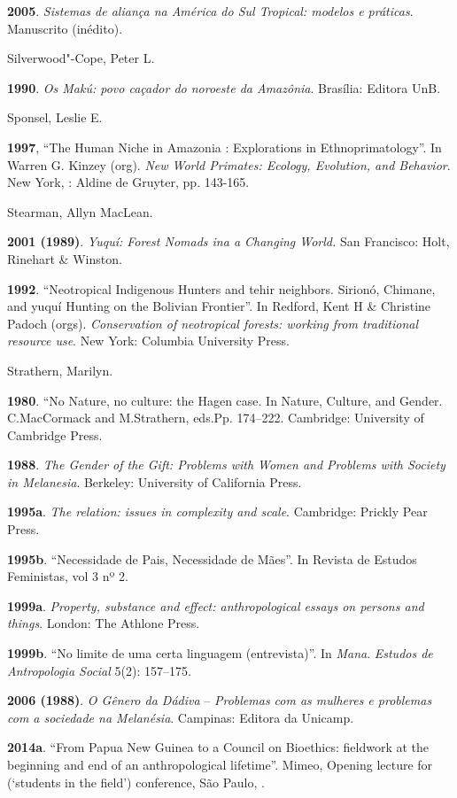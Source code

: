 \textbf{2005}. \emph{Sistemas de aliança na América do Sul Tropical:
modelos e práticas}. Manuscrito (inédito).

Silverwood"-Cope, Peter L.

\textbf{1990}. \emph{Os Makú: povo caçador do noroeste da Amazônia}.
Brasília: Editora UnB.

Sponsel, Leslie E.

\textbf{1997}, ``The Human Niche in Amazonia : Explorations in
Ethnoprimatology''. In Warren G. Kinzey (org). \emph{New World Primates:
Ecology, Evolution, and Behavior}. New York, : Aldine de Gruyter, pp.
143-165.

Stearman, Allyn MacLean.

\textbf{2001 (1989)}. \emph{Yuquí: Forest Nomads ina a Changing World.}
San Francisco: Holt, Rinehart \& Winston.

\textbf{1992}. ``Neotropical Indigenous Hunters and tehir neighbors.
Sirionó, Chimane, and yuquí Hunting on the Bolivian Frontier''. In
Redford, Kent H \& Christine Padoch (orgs). \emph{Conservation of
neotropical forests: working from traditional resource use}. New York:
Columbia University Press.

Strathern, Marilyn.

\textbf{1980}. ``No Nature, no culture: the Hagen case. In Nature,
Culture, and Gender. C.MacCormack and M.Strathern, eds.Pp. 174--222.
Cambridge: University of Cambridge Press.

\textbf{1988}. \emph{The Gender of the Gift: Problems with Women and
Problems with Society in Melanesia}. Berkeley: University of California
Press.

\textbf{1995a}. \emph{The relation: issues in complexity and scale}.
Cambridge: Prickly Pear Press.

\textbf{1995b}. ``Necessidade de Pais, Necessidade de Mães''. In Revista
de Estudos Feministas, vol 3 nº 2.

\textbf{1999a}. \emph{Property, substance and effect: anthropological
essays on persons and things}. London: The Athlone Press.

\textbf{1999b}. ``No limite de uma certa linguagem (entrevista)''. In
\emph{Mana}. \emph{Estudos de Antropologia Social} 5(2): 157--175.

\textbf{2006 (1988)}. \emph{O Gênero da Dádiva} -- \emph{Problemas com as
mulheres e problemas com a sociedade na Melanésia}. Campinas: Editora da
Unicamp.

\textbf{2014a}. ``From Papua New Guinea to a  Council on Bioethics:
fieldwork at the beginning and end of an anthropological lifetime''.
Mimeo, Opening lecture for   (`students in the field') conference,
São Paulo, .

